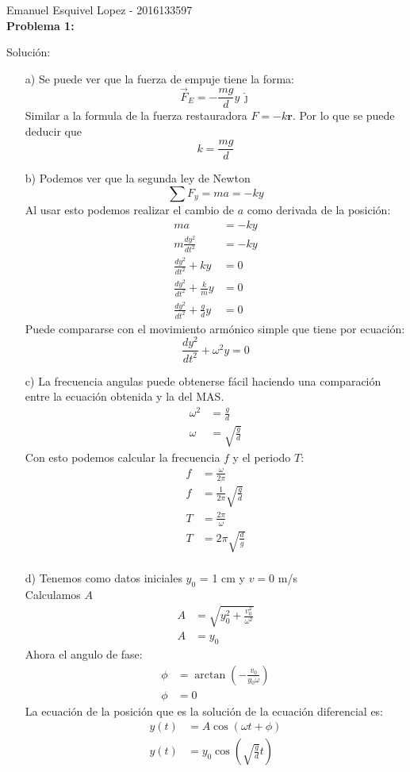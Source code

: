 \documentclass[letterpaper,12pt,addpoints]{exam}
\begin{document}
 
Emanuel Esquivel Lopez - 2016133597\\
\textbf{Problema 1:}\\

{\color{ceruleanblue}
Solución:\\
\begin{enumerate}
\item[a)] Se puede ver que la fuerza de empuje tiene la forma:
$$\vec{F}_E = -\frac{mg}{d}y\,\hat{\jmath}$$
Similar a la formula de la fuerza restauradora $F = -k\textbf{r}$.
Por lo que se puede deducir que $$k = \frac{mg}{d}$$

\item[b)] Podemos ver que la segunda ley de Newton
$$\sum F_y = ma = -ky$$
Al usar esto podemos realizar el cambio de $a$ como derivada de la posición:
\begin{align*}
ma &= -ky \\
m\frac{dy^2}{dt^2} &= -ky\\
\frac{dy^2}{dt^2}+ky &= 0 \\
\frac{dy^2}{dt^2}+\frac{k}{m} y &= 0 \\
\frac{dy^2}{dt^2}+\frac{g}{d} y &= 0 
\end{align*}
Puede compararse con el movimiento armónico simple que tiene por ecuación:
$$\frac{dy^2}{dt^2}+ \omega^2 y = 0 $$

\item[c)] La frecuencia angulas puede obtenerse fácil haciendo una comparación entre la ecuación obtenida y la del MAS.
\begin{align*}
\omega^2 &= \frac{g}{d}\\
\omega &= \sqrt{\frac{g}{d}}
\end{align*}
Con esto podemos calcular la frecuencia $f$ y el periodo $T$:
\begin{align*}
f &= \frac{\omega}{2\pi}\\
f &= \frac{1}{2\pi}\sqrt{\frac{g}{d}}\\ 
T &= \frac{2\pi}{\omega}\\
T &= 2\pi \sqrt{\frac{d}{g}}\\
\end{align*}


\item[d)] Tenemos como datos iniciales $y_0$ = 1 cm y $v=0$ m/s\\
Calculamos $A$
\begin{align*}
A &= \sqrt{y_0^2+\frac{v_0^2}{\omega^2}}\\
A &= y_0
\end{align*}
Ahora el angulo de fase:
\begin{align*}
\phi &= \arctan\left( -\frac{v_0}{y_0\omega} \right)\\
\phi &= 0
\end{align*}
La ecuación de la posición que es la solución de la ecuación diferencial es:
\begin{align*}
y(t) &= A\cos(\omega t + \phi)\\
y(t) &= y_0\cos\left( \sqrt{\frac{g}{d}}t \right)
\end{align*}



\end{enumerate}}
\end{document}
